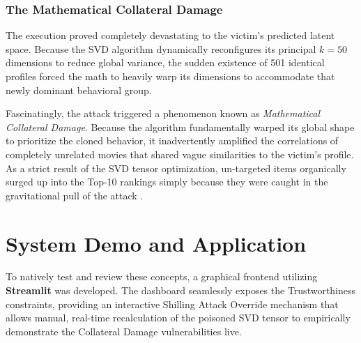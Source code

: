 \documentclass[sigconf,authordraft,nonacm]{acmart}
\begin{document}
\subsubsection{The Mathematical Collateral Damage}
The execution proved completely devastating to the victim's predicted latent space. Because the SVD algorithm dynamically reconfigures its principal $k=50$ dimensions to reduce global variance, the sudden existence of 501 identical profiles forced the math to heavily warp its dimensions to accommodate that newly dominant behavioral group. 

Fascinatingly, the attack triggered a phenomenon known as \textit{Mathematical Collateral Damage}. Because the algorithm fundamentally warped its global shape to prioritize the cloned behavior, it inadvertently amplified the correlations of completely unrelated movies that shared vague similarities to the victim's profile. As a strict result of the SVD tensor optimization, un-targeted items organically surged up into the Top-10 rankings simply because they were caught in the gravitational pull of the attack \cite{ghazimatin2020counterfactual}.

\section{System Demo and Application}
To natively test and review these concepts, a graphical frontend utilizing \textbf{Streamlit} was developed. The dashboard seamlessly exposes the Trustworthiness constraints, providing an interactive Shilling Attack Override mechanism that allows manual, real-time recalculation of the poisoned SVD tensor to empirically demonstrate the Collateral Damage vulnerabilities live.
\end{document}
